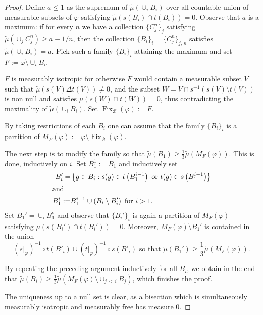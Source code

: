 \documentclass[10pt]{amsart}
\theoremstyle{definition}
\newcommand{\rb}{\mathscr{B}}
\DeclareMathOperator{\Fix}{Fix}
\newcommand{\ph}{\varphi}
\begin{document}
\begin{proof}
Define $a \leq 1$ as the supremum of $\widetilde \mu(\cup_i B_i)$ over all countable union of measurable subsets of $\ph$ satisfying $\widetilde \mu(s(B_i) \cap t(B_i))=0$. Observe that $a$ is a maximum: if for every $n$ we have a collection $\{C_j^n\}_j$ satisfying $\widetilde \mu(\cup_j C_j^n) \geq a-1/n$, then the collection $\{B_i\}_i = \{C_j^n\}_{j,\,n}$ satisfies $\widetilde \mu(\cup_i B_i)=a$. Pick such a family $\{B_i\}_i$ attaining the maximum and set $F:=\ph \setminus \cup_i B_i$.

$F$ is measurably {isotropic} for otherwise $F$ would contain a measurable subset $V$ such that $\widetilde \mu(s(V)\Delta t(V))\not=0$, and the subset $W=V\cap s^{-1}(s(V) \setminus t(V))$ is non null and satisfies $\mu(s(W)\cap t(W))=0$, thus contradicting the maximality of $\widetilde \mu(\cup_i B_i)$. Set $\Fix_{\rb}(\ph):=F$.

By taking restrictions of each $B_i$ one can assume that the family $\{B_i\}_i$ is a partition of $M_F(\ph):=\ph\setminus \Fix_{\rb}(\ph)$.

The next step is to modify the family so that $\widetilde \mu(B_1) \geq \frac 1 3 \widetilde \mu(M_F(\ph))$. This is done, inductively on $i$. Set $B_1^1:=B_1$ and inductively set
\begin{align*}
B_i'=& \left\{g \in B_i : s(g) \in t\left(B_{1}^{i-1}\right) \text{ or }t(g) \in s\left(B_1^{i-1}\right)\right\}\\
\intertext{and}
B_1^i:=& B_1^{i-1}\cup\left(B_i\setminus B_i'\right)\text{ for }i>1.
\end{align*}
Set $B_1'=\cup_i B_1^i$ and observe that $\{B_i'\}_i$ is again a partition of $M_F(\ph)$ satisfying $\mu(s(B_i') \cap t(B_i'))=0$. Moreover, $M_F(\ph)\setminus B_1'$ is contained in the union
\[
\left(s\big|_\ph\right)^{-1}\circ t\left(B'_i\right) \cup \left(t\big|_\ph\right)^{-1}\circ s(B'_i)\text{ so that }\widetilde \mu\left(B_1'\right)\geq \frac 1 3 \widetilde \mu\left(M_F(\ph)\right).
\]

By repeating the preceding argument inductively for all $B_i$, we obtain in the end that $\widetilde \mu(B_i) \geq \frac 1 3 \widetilde \mu(M_F(\ph) \setminus \cup_{j\,<\,i} B_j)$, which finishes the proof.


The uniqueness up to a null set is clear, as a bisection which is simultaneously measurably isotropic and measurably free has measure $0$.
\end{proof}
\end{document}
